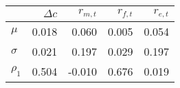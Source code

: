 \begin{tabular}{lrrrr}
\toprule
 & $\Delta c$ & $r_{m,t}$ & $r_{f,t}$ & $r_{e,t}$ \\
\midrule
$\mu$ & 0.018 & 0.060 & 0.005 & 0.054 \\
$\sigma$ & 0.021 & 0.197 & 0.029 & 0.197 \\
$\rho_1$ & 0.504 & -0.010 & 0.676 & 0.019 \\
\bottomrule
\end{tabular}
